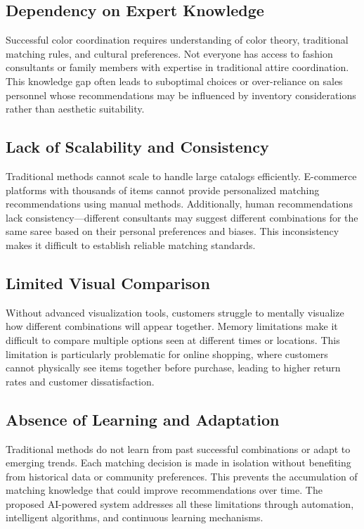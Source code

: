 \documentclass[12pt,a4paper]{report}
\begin{document}
\subsection{Dependency on Expert Knowledge}

Successful color coordination requires understanding of color theory, traditional matching rules, and cultural preferences. Not everyone has access to fashion consultants or family members with expertise in traditional attire coordination. This knowledge gap often leads to suboptimal choices or over-reliance on sales personnel whose recommendations may be influenced by inventory considerations rather than aesthetic suitability.

\subsection{Lack of Scalability and Consistency}

Traditional methods cannot scale to handle large catalogs efficiently. E-commerce platforms with thousands of items cannot provide personalized matching recommendations using manual methods. Additionally, human recommendations lack consistency—different consultants may suggest different combinations for the same saree based on their personal preferences and biases. This inconsistency makes it difficult to establish reliable matching standards.

\subsection{Limited Visual Comparison}

Without advanced visualization tools, customers struggle to mentally visualize how different combinations will appear together. Memory limitations make it difficult to compare multiple options seen at different times or locations. This limitation is particularly problematic for online shopping, where customers cannot physically see items together before purchase, leading to higher return rates and customer dissatisfaction.

\subsection{Absence of Learning and Adaptation}

Traditional methods do not learn from past successful combinations or adapt to emerging trends. Each matching decision is made in isolation without benefiting from historical data or community preferences. This prevents the accumulation of matching knowledge that could improve recommendations over time. The proposed AI-powered system addresses all these limitations through automation, intelligent algorithms, and continuous learning mechanisms.
\end{document}
